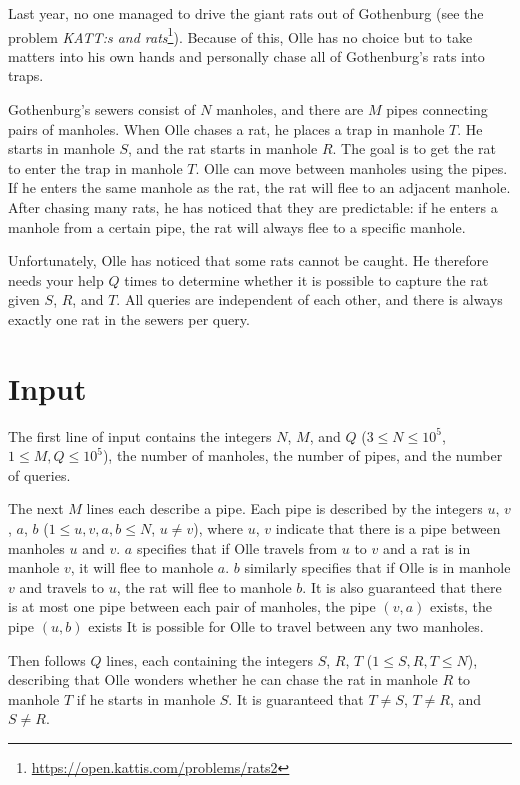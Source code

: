 
\noindent
Last year, no one managed to drive the giant rats out of Gothenburg
(see the problem \textit{KATT:s and rats}\footnote{\url{https://open.kattis.com/problems/rats2}}).
Because of this, Olle has no choice but to take matters into his own hands and personally chase all of
Gothenburg's rats into traps.

Gothenburg's sewers consist of $N$ manholes, and there are $M$ pipes connecting pairs of manholes.
When Olle chases a rat, he places a trap in manhole $T$. He starts in manhole $S$, and the rat starts in manhole $R$.
The goal is to get the rat to enter the trap in manhole $T$. Olle can move between manholes using the pipes.
If he enters the same manhole as the rat, the rat will flee to an adjacent manhole.
After chasing many rats, he has noticed that they are predictable: if he enters a manhole from a certain pipe,
the rat will always flee to a specific manhole.

Unfortunately, Olle has noticed that some rats cannot be caught.
He therefore needs your help $Q$ times to determine whether it is possible to capture the rat given $S$, $R$, and $T$.
All queries are independent of each other, and there is always exactly one rat in the sewers per query.

\section*{Input}
The first line of input contains the integers $N$, $M$, and $Q$ ($3 \leq N \leq 10^5$, $1 \le M,Q \le 10^5$),
the number of manholes, the number of pipes, and the number of queries.

The next $M$ lines each describe a pipe. Each pipe is described by the integers $u$, $v$, $a$, $b$
($1 \leq u,v,a,b \leq N$, $u \neq v$), where $u$, $v$ indicate that there is a pipe between manholes $u$ and $v$.
$a$ specifies that if Olle travels from $u$ to $v$ and a rat is in manhole $v$, it will flee to manhole $a$.
$b$ similarly specifies that if Olle is in manhole $v$ and travels to $u$, the rat will flee to manhole $b$.
It is also guaranteed that there is at most one pipe between each pair of manholes,
the pipe $(v,a)$ exists, the pipe $(u,b)$ exists It is possible for Olle to travel between any two manholes.

Then follows $Q$ lines, each containing the integers $S$, $R$, $T$ ($1 \leq S,R,T \leq N$),
describing that Olle wonders whether he can chase the rat in manhole $R$ to manhole $T$ if he starts in manhole $S$.
It is guaranteed that $T\neq S$, $T\neq R$, and $S\neq R$.

